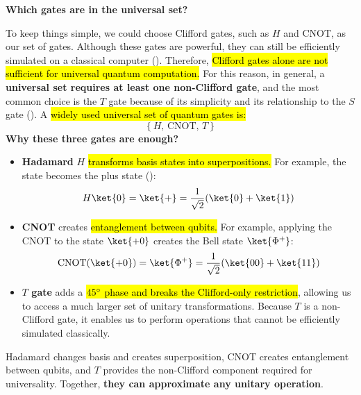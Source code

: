 \begin{flushleft}
    \textcolor{Red2}{ \textbf{Which gates are in the universal set?}}
\end{flushleft}
To keep things simple, we could choose Clifford gates, such as $H$ and CNOT, as our set of gates. Although these gates are powerful, they can still be efficiently simulated on a classical computer (). Therefore, \hl{Clifford gates alone are not sufficient for universal quantum computation.} For this reason, in general, a \textbf{universal set requires at least one non-Clifford gate}, and the most common choice is the $T$ gate because of its simplicity and its relationship to the $S$ gate (). A \hl{widely used universal set of quantum gates is:}
\begin{equation}
    \left\{H, \, \text{CNOT}, \, T\right\}
\end{equation}
\textcolor{Green3}{ \textbf{Why these three gates are enough?}}
\begin{itemize}
    \item \textbf{Hadamard} $H$ \hl{transforms basis states into superpositions.} For example, the  state becomes the plus state ():
    \begin{equation*}
        H\ket{0} = \ket{+} = \frac{1}{\sqrt{2}}(\ket{0} + \ket{1})
    \end{equation*}

    \item \textbf{CNOT} creates \hl{entanglement between qubits.} For example, applying the CNOT to the state $\ket{+0}$ creates the Bell state $\ket{\Phi^+}$:
    \begin{equation*}
        \text{CNOT}(\ket{+0}) = \ket{\Phi^+} = \frac{1}{\sqrt{2}}(\ket{00} + \ket{11})
    \end{equation*}

    \item \textbf{$T$ gate} adds a \hl{$45^\circ$ phase and breaks the Clifford-only restriction}, allowing us to access a much larger set of unitary transformations. Because $T$ is a non-Clifford gate, it enables us to perform operations that cannot be efficiently simulated classically.
\end{itemize}
Hadamard changes basis and creates superposition, CNOT creates entanglement between qubits, and $T$ provides the non-Clifford component required for universality. Together, \textbf{they can approximate any unitary operation}.

